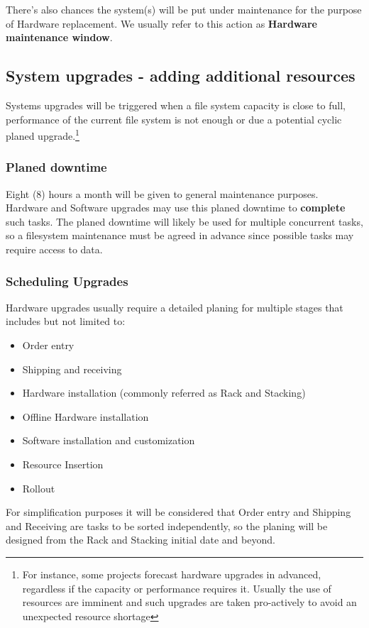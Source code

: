 \documentclass{article}
\begin{document}
There's also chances the system(s) will be put under maintenance for the purpose of Hardware replacement. We usually refer to this action as \textbf{Hardware maintenance window}.

\subsection{System upgrades - adding additional resources}
Systems upgrades will be triggered when a file system capacity is close to full, performance of the current file system is not enough or due a potential cyclic planed upgrade.\footnote{For instance, some projects forecast hardware upgrades in advanced, regardless if the capacity or performance requires it. Usually the use of resources are imminent and such upgrades are taken pro-actively to avoid an unexpected resource shortage}

\subsubsection{Planed downtime}
Eight (8) hours a month will be given to general maintenance purposes. Hardware and Software upgrades may use this planed downtime to \textbf{complete} such tasks. The planed downtime will likely be used for multiple concurrent tasks, so a filesystem maintenance must be agreed in advance since possible tasks may require access to data. 

\subsubsection{Scheduling Upgrades}

Hardware upgrades usually require a detailed planing for multiple stages that includes but not limited to:
\begin{itemize}
    \item Order entry
    \item Shipping and receiving
    \item Hardware installation (commonly referred as Rack and Stacking)
    \item Offline Hardware installation
    \item Software installation and customization
    \item Resource Insertion
    \item Rollout
\end{itemize}

For simplification purposes it will be considered that Order entry and Shipping and Receiving are tasks to be sorted independently, so the planing will be designed from the Rack and Stacking initial date and beyond.
\end{document}
